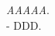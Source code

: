 \cleardoublepage
\vspace*{3cm}
\begin{flushright}
	\textit{AAAAA}. \\
	- DDD.
\end{flushright}
\cleardoublepage